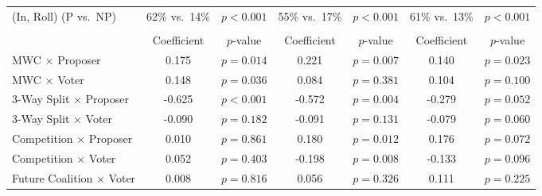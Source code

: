 \begin{table}[ht]
\begin{threeparttable}
{\begin{tabular}{l@{\hskip 24pt} c@{\hskip 10pt}c @{\hskip 24pt} c@{\hskip 10pt}c @{\hskip 24pt} c@{\hskip 10pt}c}
(In, Roll) (P vs.\ NP) & \multicolumn{1}{c}{62\% vs.\ 14\%} & \multicolumn{1}{c}{\(p{<}0.001\)} & \multicolumn{1}{c}{55\% vs.\ 17\%} & \multicolumn{1}{c}{\(p{<}0.001\)} & \multicolumn{1}{c}{61\% vs.\ 13\%} & \multicolumn{1}{c}{\(p{<}0.001\)} \\
\addlinespace[10pt]
\midrule
\addlinespace[4pt]
\multicolumn{7}{l}{\textit{Panel C: Timing (\cite{BH_JEP_2023})}} \\
\addlinespace[4pt]
 & \multicolumn{1}{c}{Coefficient} & \multicolumn{1}{c}{\(p\)-value} & \multicolumn{1}{c}{Coefficient} & \multicolumn{1}{c}{\(p\)-value} & \multicolumn{1}{c}{Coefficient} & \multicolumn{1}{c}{\(p\)-value} \\
\cmidrule(r){1-1} \cmidrule(l{2pt}r{2pt}){2-3} \cmidrule(l{2pt}r{2pt}){4-5} \cmidrule(l){6-7}
\addlinespace[3pt]
MWC \(\times\) Proposer & \multicolumn{1}{c}{0.175} & \multicolumn{1}{c}{\(p=0.014\)} & \multicolumn{1}{c}{0.221} & \multicolumn{1}{c}{\(p=0.007\)} & \multicolumn{1}{c}{0.140} & \multicolumn{1}{c}{\(p=0.023\)} \\
MWC \(\times\) Voter & \multicolumn{1}{c}{0.148} & \multicolumn{1}{c}{\(p=0.036\)} & \multicolumn{1}{c}{0.084} & \multicolumn{1}{c}{\(p=0.381\)} & \multicolumn{1}{c}{0.104} & \multicolumn{1}{c}{\(p=0.100\)} \\
3-Way Split \(\times\) Proposer & \multicolumn{1}{c}{-0.625} & \multicolumn{1}{c}{\(p{<}0.001\)} & \multicolumn{1}{c}{-0.572} & \multicolumn{1}{c}{\(p=0.004\)} & \multicolumn{1}{c}{-0.279} & \multicolumn{1}{c}{\(p=0.052\)} \\
3-Way Split \(\times\) Voter & \multicolumn{1}{c}{-0.090} & \multicolumn{1}{c}{\(p=0.182\)} & \multicolumn{1}{c}{-0.091} & \multicolumn{1}{c}{\(p=0.131\)} & \multicolumn{1}{c}{-0.079} & \multicolumn{1}{c}{\(p=0.060\)} \\
Competition \(\times\) Proposer & \multicolumn{1}{c}{0.010} & \multicolumn{1}{c}{\(p=0.861\)} & \multicolumn{1}{c}{0.180} & \multicolumn{1}{c}{\(p=0.012\)} & \multicolumn{1}{c}{0.176} & \multicolumn{1}{c}{\(p=0.072\)} \\
Competition \(\times\) Voter & \multicolumn{1}{c}{0.052} & \multicolumn{1}{c}{\(p=0.403\)} & \multicolumn{1}{c}{-0.198} & \multicolumn{1}{c}{\(p=0.008\)} & \multicolumn{1}{c}{-0.133} & \multicolumn{1}{c}{\(p=0.096\)} \\
Future Coalition \(\times\) Voter & \multicolumn{1}{c}{0.008} & \multicolumn{1}{c}{\(p=0.816\)} & \multicolumn{1}{c}{0.056} & \multicolumn{1}{c}{\(p=0.326\)} & \multicolumn{1}{c}{0.111} & \multicolumn{1}{c}{\(p=0.225\)} \\

\end{tabular}}
\end{threeparttable}
\end{table}
